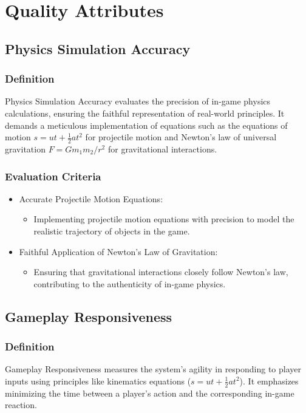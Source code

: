 \documentclass[12pt, titlepage]{article}
\begin{document}
\section{Quality Attributes}
\subsection{Physics Simulation Accuracy}
\subsubsection{Definition}
Physics Simulation Accuracy evaluates the precision of in-game physics calculations, ensuring the faithful representation of real-world principles. It demands a meticulous implementation of equations such as the equations of motion $s=ut+\frac{1}{2}at^2$ 
for projectile motion and Newton's law of universal gravitation $F=Gm_1m_2/r^2$ for gravitational interactions.

\subsubsection{Evaluation Criteria}
\begin{itemize}
    \item Accurate Projectile Motion Equations:
    \begin{itemize}
        \item Implementing projectile motion equations with precision to model the realistic trajectory of objects in the game.
    \end{itemize}
    \item Faithful Application of Newton's Law of Gravitation:
        \begin{itemize}
            \item Ensuring that gravitational interactions closely follow Newton's law, contributing to the authenticity of in-game physics.
        \end{itemize}
\end{itemize}

\subsection{Gameplay Responsiveness}
\subsubsection{Definition}
Gameplay Responsiveness measures the system's agility in responding to player inputs using principles like kinematics equations ($s=ut+\frac{1}{2}at^2$). It emphasizes minimizing the time between a player's action and the corresponding in-game reaction.
\end{document}
